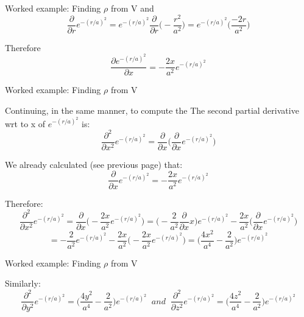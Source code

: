 {\begin{frame}{Worked example: Finding $\rho$ from V}
and
\begin{equation*}
   \frac{\partial}{\partial r} e^{-(r/a)^2} =
       e^{-(r/a)^2} \frac{\partial}{\partial r} \Big( -\frac{r^2}{a^2} \Big) =
       e^{-(r/a)^2} \Big( \frac{-2r}{a^2} \Big)
\end{equation*}

Therefore
\begin{equation*}
   \frac{\partial e^{-(r/a)^2}}{\partial x} = -\frac{2x}{a^2} e^{-(r/a)^2}
\end{equation*}

\end{frame}


%
%
%

\begin{frame}{Worked example: Finding $\rho$ from V}

Continuing, in the same manner, to compute the
The second partial derivative wrt to x of $e^{-(r/a)^2}$ is:
\begin{equation*}
   \frac{\partial^2}{\partial x^2} e^{-(r/a)^2} =
   \frac{\partial}{\partial x} \Big( \frac{\partial}{\partial x} e^{-(r/a)^2} \Big)
\end{equation*}

We already calculated (see previous page) that:
\begin{equation*}
   \frac{\partial}{\partial x} e^{-(r/a)^2} = -\frac{2x}{a^2} e^{-(r/a)^2}
\end{equation*}

Therefore:
\begin{equation*}
   \frac{\partial^2}{\partial x^2} e^{-(r/a)^2} =
   \frac{\partial}{\partial x} \Big( -\frac{2x}{a^2} e^{-(r/a)^2} \Big) =
   \Big(- \frac{2}{a^2} \frac{\partial}{\partial x} x \Big) e^{-(r/a)^2}
   - \frac{2x}{a^2} \Big(\frac{\partial}{\partial x} e^{-(r/a)^2} \Big)
\end{equation*}
\begin{equation*}
   = -\frac{2}{a^2} e^{-(r/a)^2} - \frac{2x}{a^2} \Big( -\frac{2x}{a^2} e^{-(r/a)^2} \Big) = \Big( \frac{4x^2}{a^4} - \frac{2}{a^2} \Big) e^{-(r/a)^2}
\end{equation*}

\end{frame}


%
%
%

\begin{frame}{Worked example: Finding $\rho$ from V}

Similarly:
\begin{equation*}
   \frac{\partial^2}{\partial y^2} e^{-(r/a)^2} =
     \Big( \frac{4y^2}{a^4} - \frac{2}{a^2} \Big) e^{-(r/a)^2} \;\;and\;\;
   \frac{\partial^2}{\partial z^2} e^{-(r/a)^2} =
     \Big( \frac{4z^2}{a^4} - \frac{2}{a^2} \Big) e^{-(r/a)^2}
\end{equation*}


\end{frame}}
